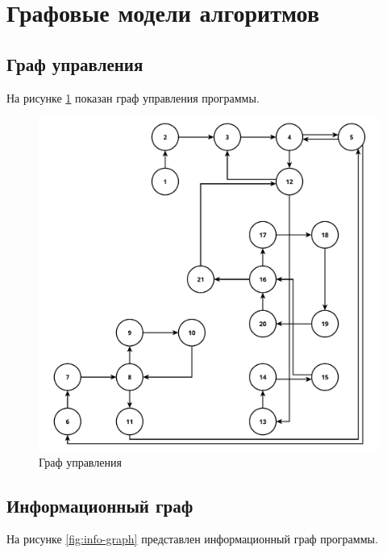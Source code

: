\section{Графовые модели алгоритмов}

\subsection{Граф управления}

На рисунке \ref{fig:ctrl-graph} показан граф управления программы.

\begin{figure}[H]
    \centering
    \includegraphics[width=1.0\textwidth, pages=-]{images/control_graph.pdf}
    \caption{Граф управления}
    \label{fig:ctrl-graph}
\end{figure}

\subsection{Информационный граф}

На рисунке \ref{fig:info-graph} представлен информационный граф программы.

